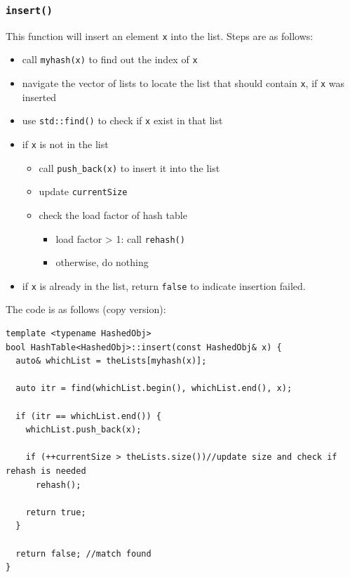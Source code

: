 \documentclass[12pt]{book}
\begin{document}
\subsubsection{\texttt{insert()}}
\label{sec:orgce9feea}
This function will insert an element \texttt{x} into the list. Steps are as follows:
\begin{itemize}
\item call \texttt{myhash(x)} to find out the index of \texttt{x}
\item navigate the vector of lists to locate the list that should contain \texttt{x}, if \texttt{x} was inserted
\item use \texttt{std::find()} to check if \texttt{x} exist in that list
\item if \texttt{x} is not in the list
\begin{itemize}
\item call \texttt{push\_back(x)} to insert it into the list
\item update \texttt{currentSize}
\item check the load factor of hash table
\begin{itemize}
\item load factor > 1: call \texttt{rehash()}
\item otherwise, do nothing
\end{itemize}
\end{itemize}
\item if \texttt{x} is already in the list, return \texttt{false} to indicate insertion failed.
\end{itemize}

The code is as follows (copy version):
\begin{verbatim}
template <typename HashedObj>
bool HashTable<HashedObj>::insert(const HashedObj& x) {
  auto& whichList = theLists[myhash(x)];

  auto itr = find(whichList.begin(), whichList.end(), x);

  if (itr == whichList.end()) {
    whichList.push_back(x);

    if (++currentSize > theLists.size())//update size and check if rehash is needed
      rehash();

    return true;
  }

  return false; //match found
}
\end{verbatim}
\end{document}
